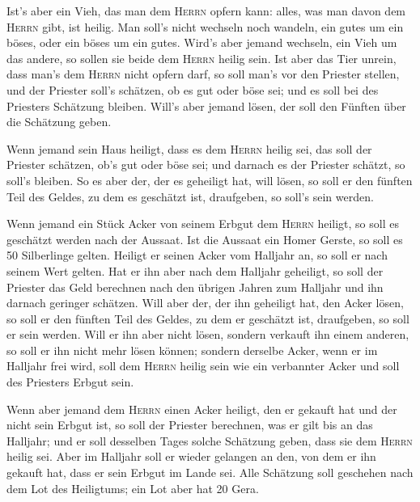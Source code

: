  Ist's aber ein Vieh, das man dem \textsc{Herrn} opfern
kann: alles, was man davon dem \textsc{Herrn} gibt, ist heilig.
 Man soll's nicht wechseln noch wandeln, ein gutes um ein
böses, oder ein böses um ein gutes. Wird's aber jemand wechseln, ein
Vieh um das andere, so sollen sie beide dem \textsc{Herrn} heilig sein.
 Ist aber das Tier unrein, dass man's dem \textsc{Herrn}
nicht opfern darf, so soll man's vor den Priester stellen,
 und der Priester soll's schätzen, ob es gut oder böse
sei; und es soll bei des Priesters Schätzung bleiben. 
Will's aber jemand lösen, der soll den Fünften über die Schätzung geben.

 Wenn jemand sein Haus heiligt, dass es dem
\textsc{Herrn} heilig sei, das soll der Priester schätzen, ob's gut oder
böse sei; und darnach es der Priester schätzt, so soll's bleiben.
 So es aber der, der es geheiligt hat, will lösen, so
soll er den fünften Teil des Geldes, zu dem es geschätzt ist,
draufgeben, so soll's sein werden.

 Wenn jemand ein Stück Acker von seinem Erbgut dem
\textsc{Herrn} heiligt, so soll es geschätzt werden nach der Aussaat.
Ist die Aussaat ein Homer Gerste, so soll es 50 Silberlinge gelten.
 Heiligt er seinen Acker vom Halljahr an, so soll er nach
seinem Wert gelten.  Hat er ihn aber nach dem Halljahr
geheiligt, so soll der Priester das Geld berechnen nach den übrigen
Jahren zum Halljahr und ihn darnach geringer schätzen. 
Will aber der, der ihn geheiligt hat, den Acker lösen, so soll er den
fünften Teil des Geldes, zu dem er geschätzt ist, draufgeben, so soll er
sein werden.  Will er ihn aber nicht lösen, sondern
verkauft ihn einem anderen, so soll er ihn nicht mehr lösen können;
 sondern derselbe Acker, wenn er im Halljahr frei wird,
soll dem \textsc{Herrn} heilig sein wie ein verbannter Acker und soll
des Priesters Erbgut sein.

 Wenn aber jemand dem \textsc{Herrn} einen Acker heiligt,
den er gekauft hat und der nicht sein Erbgut ist,  so
soll der Priester berechnen, was er gilt bis an das Halljahr; und er
soll desselben Tages solche Schätzung geben, dass sie dem \textsc{Herrn}
heilig sei.  Aber im Halljahr soll er wieder gelangen an
den, von dem er ihn gekauft hat, dass er sein Erbgut im Lande sei.
 Alle Schätzung soll geschehen nach dem Lot des
Heiligtums; ein Lot aber hat 20 Gera.

